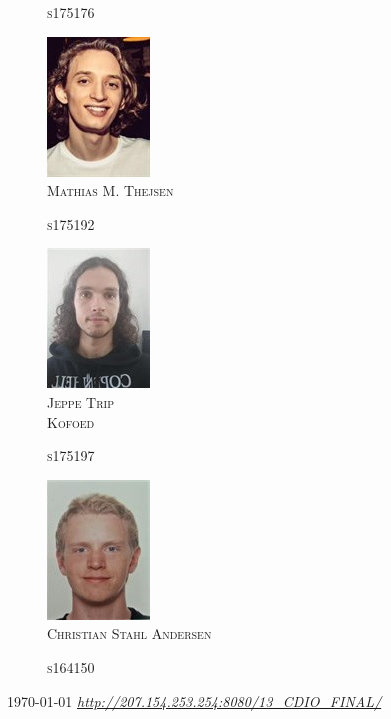 \begin{titlepage}
\begin{center}
\begin{multicols}{5}
\begin{figure}[H]
        \textsc{s175176}\\
        \hfill \break
        \hfill \break
    \end{figure}
\columnbreak
    \begin{figure}[H]
        \centering
        \includegraphics[scale=0.8]{Pictures/frontpage/mathias.png}\\
        \textsc{Mathias M. Thejsen}
        
        \textsc{s175192}\\
        \hfill \break
        \hfill \break
    \end{figure}
\columnbreak
    \begin{figure}[H]
        \centering
        \includegraphics[scale=0.8]{Pictures/frontpage/jeppe.png}\\
        \textsc{Jeppe Trip \\Kofoed}
        
        \textsc{s175197}\\
        \hfill \break
        \hfill \break
    \end{figure}
\columnbreak
    \begin{figure}[H]
        \centering
        \includegraphics[scale=0.8]{Pictures/frontpage/christian.png}\\
        \textsc{Christian Stahl Andersen}
        
        \textsc{s164150}\\
        \hfill \break
        \hfill \break
    \end{figure}
\end{multicols}
\flushleft
\centering \today %
\vfill
\flushleft
\centering \textit{\href{http://207.154.253.254:8080/13\_CDIO\_FINAL/}{http://207.154.253.254:8080/13\_CDIO\_FINAL/}}
\vfill
\end{center}

\end{titlepage}
